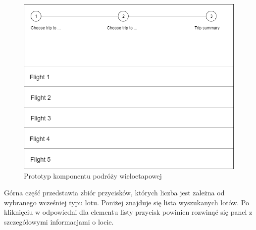 \documentclass[12pt, twoside]{report}
\begin{document}
\begin{figure}[!ht]
\centering
\includegraphics[scale=0.60, keepaspectratio]{result_interface.PNG}
\caption{Prototyp komponentu podróży wieloetapowej}
\label{fig:result_interface}
\end{figure}

\noindent Górna część przedstawia zbiór przycisków, których liczba jest zależna od wybranego wcześniej typu lotu. Poniżej znajduje się lista wyszukanych lotów. Po kliknięciu w odpowiedni dla elementu listy przycisk powinien rozwinąć się panel z szczegółowymi informacjami o locie.
\end{document}
